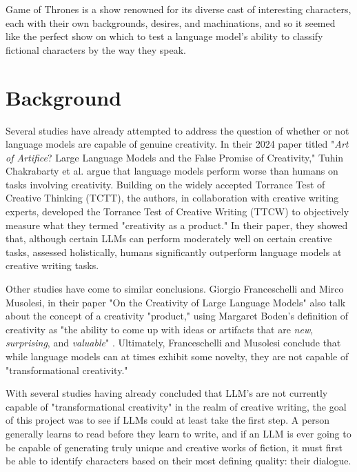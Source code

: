\documentclass[11pt]{article}
\begin{document}
Game of Thrones is a show renowned for its diverse cast of interesting characters, each with their own backgrounds, desires, and machinations, and so it seemed like the perfect show on which to test a language model's ability to classify fictional characters by the way they speak.

\section{Background}

Several studies have already attempted to address the question of whether or not language models are capable of genuine creativity. In their 2024 paper titled "\textit{Art of Artifice}? Large Language Models and the False Promise of Creativity," Tuhin Chakrabarty et al. \cite{chakrabarty2023art} argue that language models perform worse than humans on tasks involving creativity. Building on the widely accepted Torrance Test of Creative Thinking (TCTT), the authors, in collaboration with creative writing experts, developed the Torrance Test of Creative Writing (TTCW) to objectively measure what they termed "creativity as a product." In their paper, they showed that, although certain LLMs can perform moderately well on certain creative tasks, assessed holistically, humans significantly outperform language models at creative writing tasks.

Other studies have come to similar conclusions. Giorgio Franceschelli and Mirco Musolesi, in their paper "On the Creativity of Large Language Models" \cite{franceschelli2023creativity} also talk about the concept of a creativity "product," using Margaret Boden's definition of creativity as "the ability to come up with ideas or artifacts that are \textit{new}, \textit{surprising}, and \textit{valuable}" \cite{boden2003autodidacts}. Ultimately, Franceschelli and Musolesi conclude that while language models can at times exhibit some novelty, they are not capable of "transformational creativity."

With several studies having already concluded that LLM's are not currently capable of "transformational creativity" in the realm of creative writing, the goal of this project was to see if LLMs could at least take the first step. A person generally learns to read before they learn to write, and if an LLM is ever going to be capable of generating truly unique and creative works of fiction, it must first be able to identify characters based on their most defining quality: their dialogue.
\end{document}
